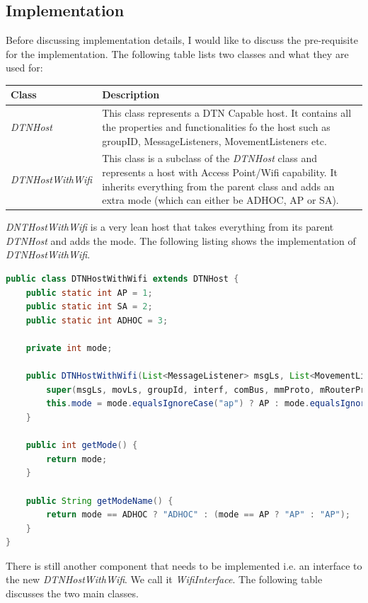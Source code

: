 \subsection{Implementation}
Before discussing implementation details, I would like to discuss the pre-requisite for the implementation. The following table lists two classes and what they are used for:
	\begin{center} 
	    \begin{tabular}{ | l | p{11cm} |}
    		\hline
    		\textbf{Class} & \textbf{Description} \\ \hline
    		\textit{DTNHost} & This class represents a DTN Capable host. It contains all the properties and functionalities fo the host such as groupID, MessageListeners, MovementListeners etc. \\ \hline
    		\textit{DTNHostWithWifi} & This class is a subclass of the \textit{DTNHost} class and represents a host with Access Point/Wifi capability. It inherits everything from the parent class and adds an extra mode (which can either be ADHOC, AP or SA). \\ \hline
    	\end{tabular}
	\end{center}
\vspace{3mm}
\textit{DNTHostWithWifi} is a very lean host that takes everything from its parent \textit{DTNHost} and adds the mode. The following listing shows the implementation of \textit{DTNHostWithWifi}.
\begin{lstlisting}[language=java]
public class DTNHostWithWifi extends DTNHost {
	public static int AP = 1;
	public static int SA = 2;
	public static int ADHOC = 3;
	
	private int mode;

	public DTNHostWithWifi(List<MessageListener> msgLs, List<MovementListener> movLs, String groupId,List<NetworkInterface> interf, ModuleCommunicationBus comBus, MovementModel mmProto, MessageRouter mRouterProto, String mode) {	
		super(msgLs, movLs, groupId, interf, comBus, mmProto, mRouterProto);	
		this.mode = mode.equalsIgnoreCase("ap") ? AP : mode.equalsIgnoreCase("sa") ? SA : ADHOC;
	}
	
	public int getMode() {
		return mode;
	}
	
	public String getModeName() {		
		return mode == ADHOC ? "ADHOC" : (mode == AP ? "AP" : "AP");
	}
}
\end{lstlisting}
\vspace{5mm}
There is still another component that needs to be implemented i.e. an interface to the new \textit{DTNHostWithWifi}. We call it \textit{WifiInterface}. The following table discusses the two main classes.

